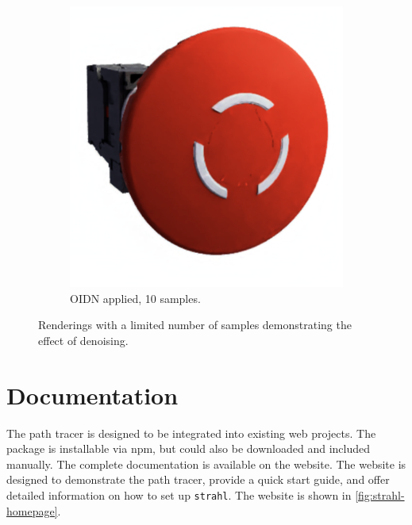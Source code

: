 \begin{figure}[H]
\begin{subfigure}[t]{0.4\textwidth}
        \includegraphics[width=\textwidth]{resources/denoise-oidn-10-samples.png}
        \caption{\gls{OIDN} applied, 10 samples.}
        \label{fig:denoise-oidn-10-samples}
    \end{subfigure}
    \hspace*{0.8cm}
    \caption{Renderings with a limited number of samples demonstrating the effect of denoising.}
    \label{fig:denoise-samples}
\end{figure}

\newpage

\section{Documentation}

The path tracer is designed to be integrated into existing web projects. The package is installable via \gls{npm}, but could also be downloaded and included manually. The complete documentation is available on the website. The website is designed to demonstrate the path tracer, provide a quick start guide, and offer detailed information on how to set up \texttt{strahl}. The website is shown in \autoref{fig:strahl-homepage}.

